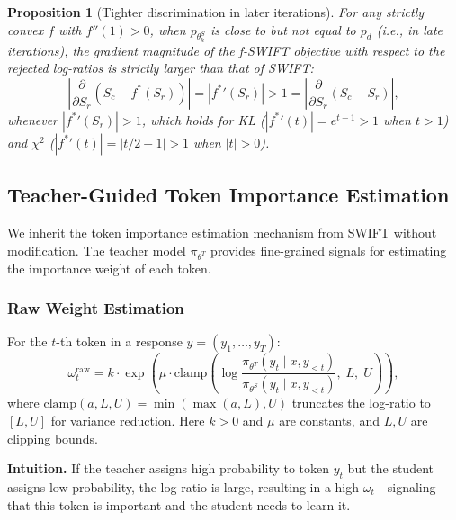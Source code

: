 \documentclass[11pt,a4paper]{article}
\newtheorem{proposition}[theorem]{Proposition}
\begin{document}
\begin{proposition}[Tighter discrimination in later iterations]
\label{prop:tighter}
For any strictly convex $f$ with $f''(1) > 0$, when $p_{\theta^S_k}$ is close to but not equal to $p_d$ (i.e., in late iterations), the gradient magnitude of the f-SWIFT objective with respect to the rejected log-ratios is strictly larger than that of SWIFT:
\begin{equation}
    \left|\frac{\partial}{\partial S_r} \left(S_c - f^*(S_r)\right)\right| = |{f^*}'(S_r)| > 1 = \left|\frac{\partial}{\partial S_r} (S_c - S_r)\right|,
    \label{eq:gradient_comparison}
\end{equation}
whenever $|{f^*}'(S_r)| > 1$, which holds for KL ($|{f^*}'(t)| = e^{t-1} > 1$ when $t > 1$) and $\chi^2$ ($|{f^*}'(t)| = |t/2 + 1| > 1$ when $|t| > 0$).
\end{proposition}

\subsection{Teacher-Guided Token Importance Estimation}
\label{subsec:teacher}

We inherit the token importance estimation mechanism from SWIFT without modification. The teacher model $\pi_{\theta^T}$ provides fine-grained signals for estimating the importance weight of each token.

\subsubsection{Raw Weight Estimation}

For the $t$-th token in a response $y = (y_1, \ldots, y_T)$:
\begin{equation}
    \omega_t^{\mathrm{raw}} = k \cdot \exp\!\left(\mu \cdot \mathrm{clamp}\!\left(\log \frac{\pi_{\theta^T}(y_t \mid x, y_{<t})}{\pi_{\theta^S}(y_t \mid x, y_{<t})},\; L,\; U\right)\right),
    \label{eq:raw_weight}
\end{equation}
where $\mathrm{clamp}(a, L, U) = \min(\max(a, L), U)$ truncates the log-ratio to $[L, U]$ for variance reduction. Here $k > 0$ and $\mu$ are constants, and $L, U$ are clipping bounds.

\textbf{Intuition.} If the teacher assigns high probability to token $y_t$ but the student assigns low probability, the log-ratio is large, resulting in a high $\omega_t$---signaling that this token is important and the student needs to learn it.
\end{document}
